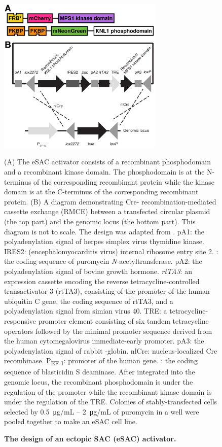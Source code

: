 \begin{figure}
    \centering
    \includegraphics[width=0.7\textwidth]{chapters/figures/eSAC+Cre-lox.pdf}
    \caption{\textbf{The design of an ectopic SAC (eSAC) activator.}}
    \noindent\justifying (A) The eSAC activator consists of a recombinant  phosphodomain and a recombinant  kinase domain. The phosphodomain is at the N-terminus of the corresponding recombinant protein while the kinase domain is at the C-terminus of the corresponding recombinant protein. (B) A diagram demonstrating Cre- recombination-mediated cassette exchange (RMCE) between a transfected circular plasmid (the top part) and the genomic locus (the bottom part). This diagram is not to scale. The design was adapted from \cite{HeLa-A12_Khandelia2011, HeLa-A12_Ballister2014}. pA1: the polyadenylation signal of herpes simplex virus thymidine kinase. IRES2: (encephalomyocarditis virus) internal ribosome entry site 2. : the coding sequence of puromycin \textit{N}-acetyltransferase. pA2: the polyadenylation signal of bovine growth hormone. \textit{rtTA3}: an expression cassette encoding the reverse tetracycline-controlled transactivator 3 (rtTA3), consisting of the promoter of the human ubiquitin C gene, the coding sequence of rtTA3, and a polyadenylation signal from simian virus 40. TRE: a tetracycline-responsive promoter element consisting of six tandem tetracycline operators followed by the minimal promoter sequence derived from the human cytomegalovirus immediate-early promoter. pA3: the polyadenylation signal of rabbit \textbeta{}-globin. nlCre: nucleus-localized Cre recombinase. P\textsubscript{EF-1\textalpha{}}: promoter of the human  gene. : the coding sequence of blasticidin S deaminase. After integrated into the genomic locus, the recombinant phosphodomain is under the regulation of the  promoter while the recombinant kinase domain is under the regulation of the TRE. Colonies of stably-transfected cells selected by \SI{0.5}{\micro g/mL} -- \SI{2}{\micro g/mL} of puromycin in a well were pooled together to make an eSAC cell line.
    \label{eSAC+Cre-lox}
\end{figure}

